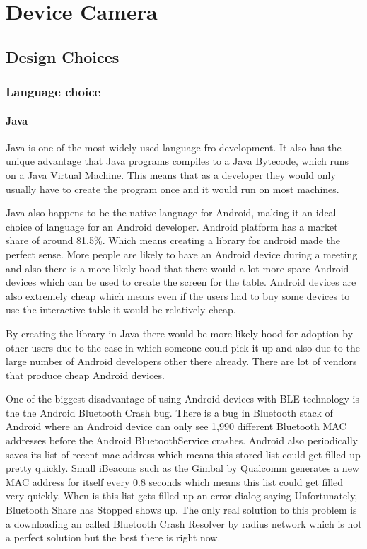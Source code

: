 \chapter{Device Camera}

\label{ch:devcamera}
\section{Design Choices}
\subsection{Language choice}


\subsubsection{Java}

Java is one of the most widely used language fro development. It also
has the unique advantage that Java programs compiles to a Java Bytecode,
which runs on a Java Virtual Machine. This means that as a developer
they would only usually have to create the program once and it would
run on most machines. 

Java also happens to be the native language for Android, making it
an ideal choice of language for an Android developer. Android platform
has a market share of around 81.5\%\cite{market-share}. Which means
creating a library for android made the perfect sense. More people
are likely to have an Android device during a meeting and also there
is a more likely hood that there would a lot more spare Android devices
which can be used to create the screen for the table. Android devices
are also extremely cheap which means even if the users had to buy
some devices to use the interactive table it would be relatively cheap.

By creating the library in Java there would be more likely hood for
adoption by other users due to the ease in which someone could pick
it up and also due to the large number of Android developers other
there already. There are lot of vendors that produce cheap Android
devices\cite{cheap-android}. 

One of the biggest disadvantage of using Android devices with BLE
technology is the the Android Bluetooth Crash bug\cite{bluetooth-share}.
There is a bug in Bluetooth stack of Android where an Android device
can only see 1,990 different Bluetooth MAC addresses before the Android
BluetoothService crashes. Android also periodically saves its list
of recent mac address which means this stored list could get filled
up pretty quickly. Small iBeacons such as the Gimbal by Qualcomm generates
a new MAC address for itself every 0.8 seconds which means this list
could get filled very quickly. When is this list gets filled up an
error dialog saying \textquotedbl{}Unfortunately, Bluetooth Share
has Stopped\textquotedbl{} shows up. The only real solution to this
problem is a downloading an called Bluetooth Crash Resolver by radius
network which is not a perfect solution but the best there is right
now.


